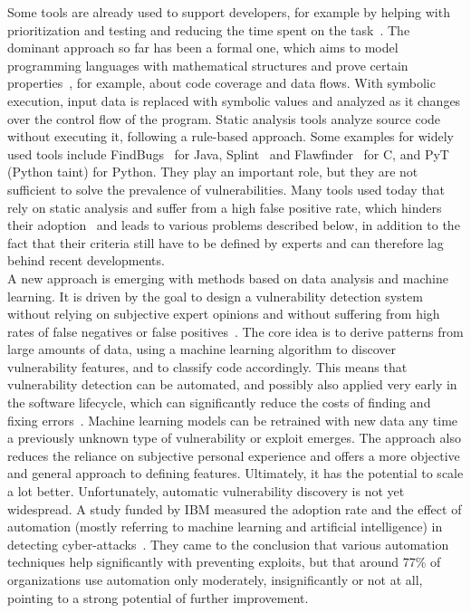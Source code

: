 \documentclass[
a4paper,
pagesize,
pdftex,
12pt,
ngerman,
fleqn,
final,
]{scrartcl}
\begin{document}
	Some tools are already used to support developers, for example by helping with prioritization and testing and reducing the time spent on the task~\cite{Dam.2017}. The dominant approach so far has been a formal one, which aims to model programming languages with mathematical structures and prove certain properties~\cite{Allamanis.2018}, for example, about code coverage and data flows. With symbolic execution, input data is replaced with symbolic values and analyzed as it changes over the control flow of the program. Static analysis tools analyze source code without executing it, following a rule-based approach. Some examples for widely used tools include FindBugs~\cite{Hovemeyer.2004,Hovemeyer.2005} for Java, Splint~\cite{Evans.2002} and Flawfinder~\cite{Wheeler.2006} for C, and PyT~\cite{Micheelsen.2016} (Python taint) for Python. They play an important role, but they are not sufficient to solve the prevalence of vulnerabilities. Many tools used today that rely on static analysis and suffer from a high false positive rate, which hinders their adoption~\cite{Liu.2018} and leads to various problems described below, in addition to the fact that their criteria still have to be defined by experts and can therefore lag behind recent developments.\\
	A new approach is emerging with methods based on data analysis and machine learning. It is driven by the goal to design a vulnerability detection system without relying on subjective expert opinions and without suffering from high rates of false negatives or false positives~\cite{Li.2018}. The core idea is to derive patterns from large amounts of data, using a machine learning algorithm to discover vulnerability features, and to classify code accordingly. This means that vulnerability detection can be automated, and possibly also applied very early in the software lifecycle, which can significantly reduce the costs of finding and fixing errors~\cite{Dam.2017,Gupta.2014}. Machine learning models can be retrained with new data any time a previously unknown type of vulnerability or exploit emerges. The approach also reduces the reliance on subjective personal experience and offers a more objective and general approach to defining features. Ultimately, it has the potential to scale a lot better. Unfortunately, automatic vulnerability discovery is not yet widespread. A study funded by IBM measured the adoption rate and the effect of automation (mostly referring to machine learning and artificial intelligence) in detecting cyber-attacks~\cite{IBMNewsRoom.}. They came to the conclusion that various automation techniques help significantly with preventing exploits, but that around 77\% of organizations use automation only moderately, insignificantly or not at all, pointing to a strong potential of further improvement. 
	
\end{document}
